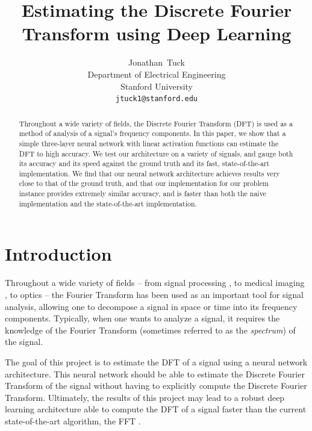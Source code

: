 \documentclass[12pt]{article}
\title{
Estimating the Discrete Fourier Transform using Deep Learning
}
\author{
  Jonathan~Tuck\\
  Department of Electrical Engineering\\
  Stanford University\\
  \texttt{jtuck1@stanford.edu} \\
}
\begin{document}
\maketitle

\begin{abstract}
Throughout a wide variety of fields, the Discrete Fourier Transform (DFT) is used as a method of analysis 
of a signal's frequency components. In this paper, we show that a simple three-layer neural network with linear activation 
functions can estimate the DFT to high accuracy. We test our architecture on a variety of signals, and gauge both its 
accuracy and its speed against the ground truth and its fast, state-of-the-art implementation. We find that our neural 
network architecture achieves results very close to that of the ground truth, and that our implementation for our problem 
instance provides extremely similar accuracy, and is faster than both the naive implementation and the 
state-of-the-art implementation.
\end{abstract}

\section{Introduction}
Throughout a wide variety of fields -- from signal processing \cite{OS:99}, to medical imaging \cite{S:00}, 
to optics \cite{G:96} -- the Fourier Transform has been used as an important tool for signal analysis, allowing 
one to decompose a signal in space or time into its frequency components. Typically, when one wants to analyze a 
signal, it requires the knowledge of the Fourier Transform (sometimes referred to as the \emph{spectrum}) of the 
signal. 


The goal of this project is to estimate the DFT of a signal using a neural network architecture.
This neural network should be able to estimate the Discrete Fourier Transform of the signal without 
having to explicitly compute the Discrete Fourier Transform. Ultimately, the results of this project may lead to 
a robust deep learning architecture able to compute the DFT of a signal faster than the current state-of-the-art 
algorithm, the FFT \cite{CT:65}.
\end{document}
